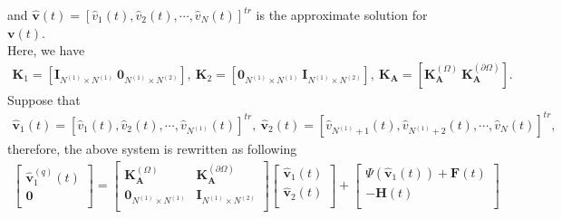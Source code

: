 \documentclass[9pt]{article}
\numberwithin{equation}{section}
\begin{document}
and
$\widehat{\textbf{v}}(t)=[\widehat{v}_{1}(t),\widehat{v}_{2}(t),\cdots,\widehat{v}_{N}(t)]^{tr}$ is the approximate solution for $\textbf{v}(t)$.\\
Here, we have
\begin{eqnarray*}
 \textbf{K}_{1}=[ \textbf{I}_{N^{(1)}\times N^{(1)}}~\textbf{0}_{N^{(1)}\times N^{(2)}}],~ \textbf{K}_{2}=[ \textbf{0}_{N^{(1)}\times N^{(1)}}~\textbf{I}_{N^{(1)}\times N^{(2)}}],~\textbf{K}_{\mathbf{A}}=[ \textbf{K}^{(\Omega)}_{\mathbf{A}}~\textbf{K}^{(\partial \Omega)}_{\mathbf{A}}].
\end{eqnarray*}
Suppose that
\begin{eqnarray*}
\widehat{\textbf{v}}_1(t)=[\widehat{v}_{1}(t),\widehat{v}_{2}(t),\cdots,\widehat{v}_{N^{(1)}}(t)]^{tr},~
\widehat{\textbf{v}}_2(t)=[\widehat{v}_{N^{(1)}+1}(t),\widehat{v}_{N^{(1)}+2}(t),\cdots,\widehat{v}_{N}(t)]^{tr},
\end{eqnarray*}
therefore, the above system is rewritten as following
\begin{eqnarray}\label{ki1q1}
\left[
  \begin{array}{c}
    \widehat{\textbf{v}}_1^{(q )}(t)\\
    \textbf{0}\\
  \end{array}
\right]=\left[
          \begin{array}{cc}
            \textbf{K}^{(\Omega)}_{\mathbf{A}} & \textbf{K}^{(\partial \Omega)}_{\mathbf{A}} \\
           \textbf{0}_{N^{(1)}\times N^{(1)}}&\textbf{I}_{N^{(1)}\times N^{(2)}} \\
          \end{array}
        \right]\left[
                 \begin{array}{c}
                  \widehat{\textbf{v}}_1(t) \\
                   \widehat{\textbf{v}}_2(t) \\
                 \end{array}
               \right]+\left[
                         \begin{array}{c}
                           \Psi(\widehat{\textbf{v}}_1(t)) +\textbf{F}(t) \\
                           -\textbf{H}(t) \\
                         \end{array}
                       \right]
\end{eqnarray}
\end{document}
